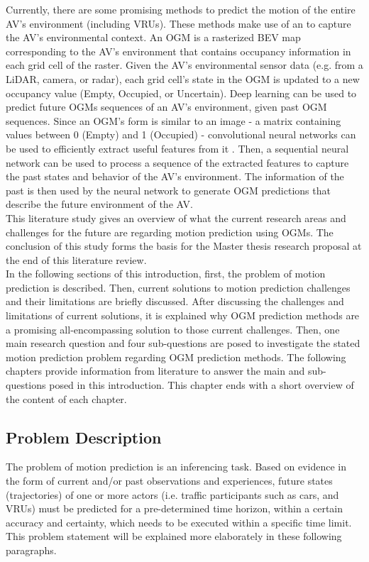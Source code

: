 Currently, there are some promising methods to predict the motion of the entire \gls{AV}'s environment (including \glspl{VRU}). These methods make use of an  to capture the \gls{AV}'s environmental context. An \gls{OGM} is a rasterized \gls{BEV} map corresponding to the \gls{AV}'s environment that contains occupancy information in each grid cell of the raster. Given the \gls{AV}'s environmental sensor data (e.g. from a LiDAR, camera, or radar), each grid cell's state in the \gls{OGM} is updated to a new occupancy value (Empty, Occupied, or Uncertain). Deep learning can be used to predict future \glspl{OGM} sequences of an \gls{AV}'s environment, given past \gls{OGM} sequences. Since an \gls{OGM}'s form is similar to an image - a matrix containing values between 0 (Empty) and 1 (Occupied) - convolutional neural networks can be used to efficiently extract useful features from it \cite{albawi2017understanding}. Then, a sequential neural network can be used to process a sequence of the extracted features to capture the past states and behavior of the \gls{AV}'s environment. The information of the past is then used by the neural network to generate \gls{OGM} predictions that describe the future environment of the \gls{AV}. \\


This literature study gives an overview of what the current research areas and challenges for the future are regarding motion prediction using \glspl{OGM}. The conclusion of this study forms the basis for the Master thesis research proposal at the end of this literature review. \\

In the following sections of this introduction, first, the problem of motion prediction is described. Then, current solutions to motion prediction challenges and their limitations are briefly discussed. After discussing the challenges and limitations of current solutions, it is explained why \gls{OGM} prediction methods are a promising all-encompassing solution to those current challenges. Then, one main research question and four sub-questions are posed to investigate the stated motion prediction problem regarding \gls{OGM} prediction methods. The following chapters provide information from literature to answer the main and sub-questions posed in this introduction. This chapter ends with a short overview of the content of each chapter.

\subsection{Problem Description} 
The problem of motion prediction is an inferencing task. Based on evidence in the form of current and/or past observations and experiences, future states (trajectories) of one or more actors (i.e. traffic participants such as cars, and \glspl{VRU}) must be predicted for a pre-determined time horizon, within a certain accuracy and certainty, which needs to be executed within a specific time limit. This problem statement will be explained more elaborately in these following paragraphs. \\

